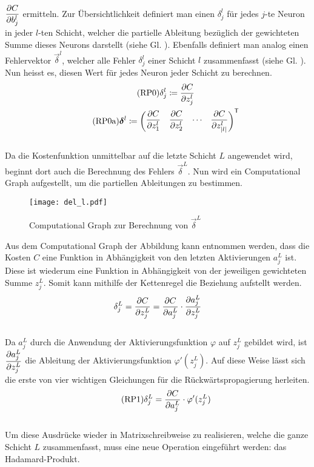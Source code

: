 \begin{appendices}
$\displaystyle\frac{\partial C}{\partial b_j^l}$ ermitteln.
\para{}
Zur Übersichtlichkeit definiert man einen  $\delta_j^l$ für
jedes $j$-te Neuron in jeder $l$-ten Schicht, welcher die partielle Ableitung bezüglich der
gewichteten Summe dieses Neurons darstellt (siehe Gl. ). Ebenfalls definiert man analog einen Fehlervektor
$\vec{\delta}^l$, welcher alle Fehler $\delta_j^l$ einer Schicht $l$
zusammenfasst (siehe Gl. ). Nun heisst es, diesen Wert für jedes Neuron jeder Schicht zu
berechnen.
\\
\begin{gather}
  \tag{RP0}\label{eq:RP0} \delta_j^l \coloneqq \frac{\partial C}{\partial z_j^l} \\
  \tag{RP0a}\label{eq:RP0a} \bm{\delta}^l \coloneqq \begin{pmatrix} \displaystyle\frac{\partial C}{\partial z_1^l} & \displaystyle\frac{\partial C}{\partial z_2^l} & \cdots & \displaystyle\frac{\partial C}{\partial z_{|l|}^l} \end{pmatrix}^{\mathsf{T}}
\end{gather}
\\
Da die Kostenfunktion unmittelbar auf die letzte Schicht $L$ angewendet wird, beginnt
dort auch die Berechnung des Fehlers $\vec{\delta}^L$.
Nun wird ein Computational Graph aufgestellt, um die partiellen Ableitungen zu bestimmen.
\para{}
\begin{figure}[h!]
  \centering
  \texttt{[image: del\_l.pdf]}
  \caption{Computational Graph zur Berechnung von $\vec{\delta}^L$}
  \label{fig:cg_L}
\end{figure}
\para{}
Aus dem Computational Graph der Abbildung  kann entnommen werden, dass die Kosten $C$ eine Funktion
in Abhängigkeit von den letzten Aktivierungen $a_j^L$ ist. Diese ist wiederum
eine Funktion in Abhängigkeit von der jeweiligen gewichteten Summe $z_j^L$.
Somit kann mithilfe der Kettenregel die Beziehung 
aufstellt werden.
\\
\begin{equation}\label{eq:RPh1}
  \delta_j^L = \frac{\partial C}{\partial z_j^L} = \frac{\partial C}{\partial a_j^L} \cdot \frac{\partial a_j^L}{\partial z_j^L}
\end{equation}
\\
Da $a_j^L$ durch die Anwendung der Aktivierungsfunktion $\varphi$ auf $z_j^L$
gebildet wird, ist $\displaystyle\frac{\partial a_j^L}{\partial z_j^L}$ die Ableitung der Aktivierungsfunktion
$\varphi'(z_j^L)$. Auf diese Weise lässt sich die erste  von vier
wichtigen Gleichungen für die Rückwärtspropagierung herleiten.
\\
\begin{equation}\tag{RP1}\label{eq:RP1}
  \delta_j^L = \frac{\partial C}{\partial a_j^L} \cdot \varphi'(z_j^L)
\end{equation}
\\
Um diese Ausdrücke wieder in Matrixschreibweise zu realisieren,
welche die ganze Schicht $L$ zusammenfasst, muss eine
neue Operation eingeführt werden: das Hadamard-Produkt.


\end{appendices}
